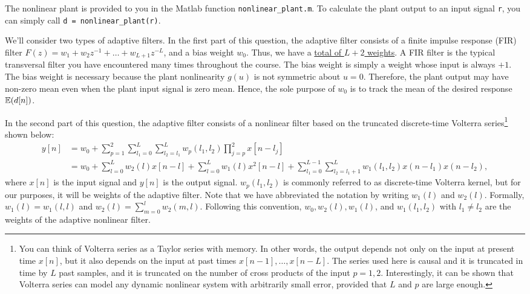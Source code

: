\documentclass[10pt]{article}
\begin{document}
The nonlinear plant is provided to you in the Matlab function \texttt{nonlinear\_plant.m}. To calculate the plant output to an input signal \texttt{r}, you can simply call \texttt{d = nonlinear\_plant(r)}.

We'll consider two types of adaptive filters. In the first part of this question, the adaptive filter consists of a finite impulse response (FIR) filter $F(z) = w_1 + w_2z^{-1}+\ldots+w_{L+1}z^{-L}$, and a bias weight $w_0$. Thus, we have a \underline{total of $L+2$ weights}. A FIR filter is the typical transversal filter you have encountered many times throughout the course. The bias weight is simply a weight whose input is always $+1$. The bias weight is necessary because the plant nonlinearity $g(u)$ is not symmetric about $u = 0$. Therefore, the plant output may have non-zero mean even when the plant input signal is zero mean. Hence, the sole purpose of $w_0$ is to track the mean of the desired response $\operatorname{\mathbb{E}}(d[n])$.

In the second part of this question, the adaptive filter consists of a nonlinear filter based on the truncated discrete-time Volterra series\footnote{\normalsize You can think of Volterra series as a Taylor series with memory. In other words, the output depends not only on the input at present time $x[n]$, but it also depends on the input at past times $x[n-1], \ldots, x[n-L]$. The series used here is causal and it is truncated in time by $L$ past samples, and it is truncated on the number of cross products of the input $p = 1, 2$. Interestingly, it can be shown that Volterra series can model any dynamic nonlinear system with arbitrarily small error, provided that $L$ and $p$ are large enough.} shown below:
\begin{align} \nonumber \label{eq:volterra}
y[n] &= w_0 + \sum_{p = 1}^{2}\sum_{l_1 = 0}^L\sum_{l_2 = l_1}^L w_{p}(l_1, l_2)\prod_{j = p}^2x[n-l_j] \\
& = w_0 + \sum_{l = 0}^Lw_2(l)x[n-l] + \sum_{l = 0}^Lw_1(l)x^2[n-l] + \sum_{l_1 = 0}^{L-1}\sum_{l_2 = l_1+1}^L w_{1}(l_1, l_2)x(n-l_1)x(n-l_2),
\end{align}
where $x[n]$ is the input signal and $y[n]$ is the output signal.  $w_p(l_1, l_2)$ is commonly referred to as discrete-time Volterra kernel, but for our purposes, it will be weights of the adaptive filter. Note that we have abbreviated the notation by writing $w_1(l)$ and $w_2(l)$. Formally, $w_1(l) = w_1(l, l)$ and $w_2(l) = \sum_{m = 0}^{l}w_2(m, l)$. Following this convention, $w_0, w_2(l), w_1(l)$, and $w_1(l_1, l_2)$ with $l_1\neq l_2$ are the weights of the adaptive nonlinear filter. 
\end{document}
